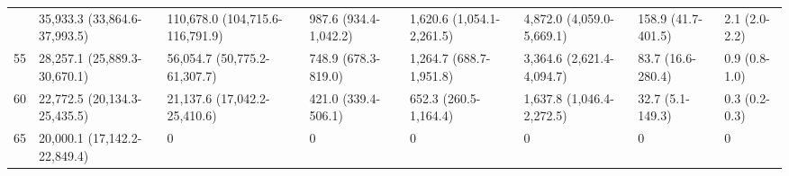 \begin{table}
\begin{tabular}[t]{rlllllll}
\addlinespace
50 & 35,933.3 (33,864.6-37,993.5) & 110,678.0 (104,715.6-116,791.9) & 987.6 (934.4-1,042.2) & 1,620.6 (1,054.1-2,261.5) & 4,872.0 (4,059.0-5,669.1) & 158.9 (41.7-401.5) & 2.1 (2.0-2.2)\\
55 & 28,257.1 (25,889.3-30,670.1) & 56,054.7 (50,775.2-61,307.7) & 748.9 (678.3-819.0) & 1,264.7 (688.7-1,951.8) & 3,364.6 (2,621.4-4,094.7) & 83.7 (16.6-280.4) & 0.9 (0.8-1.0)\\
60 & 22,772.5 (20,134.3-25,435.5) & 21,137.6 (17,042.2-25,410.6) & 421.0 (339.4-506.1) & 652.3 (260.5-1,164.4) & 1,637.8 (1,046.4-2,272.5) & 32.7 (5.1-149.3) & 0.3 (0.2-0.3)\\
65 & 20,000.1 (17,142.2-22,849.4) & 0 & 0 & 0 & 0 & 0 & 0\\
\bottomrule
\end{tabular}
\end{table}